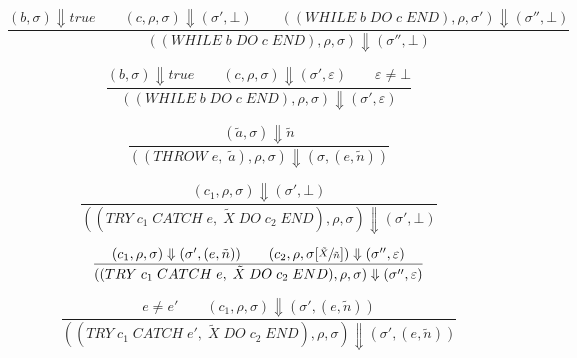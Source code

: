 \begin{equation}
\frac{(b, \sigma) \Downarrow true \qquad (c, \rho, \sigma) \Downarrow (\sigma', \bot) \qquad ((WHILE\; b\; DO\; c\; END), \rho, \sigma') \Downarrow (\sigma'', \bot)}{((WHILE\; b\; DO\; c\; END), \rho, \sigma) \Downarrow (\sigma'', \bot)}
\end{equation}

\begin{equation}
\frac{(b, \sigma) \Downarrow true \qquad (c, \rho, \sigma) \Downarrow (\sigma', \varepsilon) \qquad \varepsilon \neq \bot}{((WHILE\; b\; DO\; c\; END), \rho, \sigma) \Downarrow (\sigma', \varepsilon)}
\end{equation}

\begin{equation}
\frac{(\tilde{a}, \sigma) \Downarrow \tilde{n}}{((THROW\; e,\; \tilde{a}), \rho, \sigma) \Downarrow (\sigma, (e, \tilde{n}))}
\end{equation}

\begin{equation}
\frac{(c_1, \rho, \sigma) \Downarrow (\sigma', \bot)}{((TRY\; c_1\; CATCH\; e,\; \tilde{X}\; DO\; c_2\; END), \rho, \sigma) \Downarrow (\sigma', \bot)}
\end{equation}

\begin{equation}
\frac{(c_1, \rho, \sigma) \Downarrow (\sigma', (e, \tilde{n})) \qquad (c_2, \rho, \sigma[\sfrac{\tilde{X}}{\tilde{n}}]) \Downarrow (\sigma'', \varepsilon)}{((TRY\; c_1\; CATCH\; e,\; \tilde{X}\; DO\; c_2\; END), \rho, \sigma) \Downarrow (\sigma'', \varepsilon)}
\end{equation}

\begin{equation}
\frac{e \neq e' \qquad (c_1, \rho, \sigma) \Downarrow (\sigma', (e, \tilde{n}))}{((TRY\; c_1\; CATCH\; e',\; \tilde{X}\; DO\; c_2\; END), \rho, \sigma) \Downarrow (\sigma', (e, \tilde{n}))}
\end{equation}